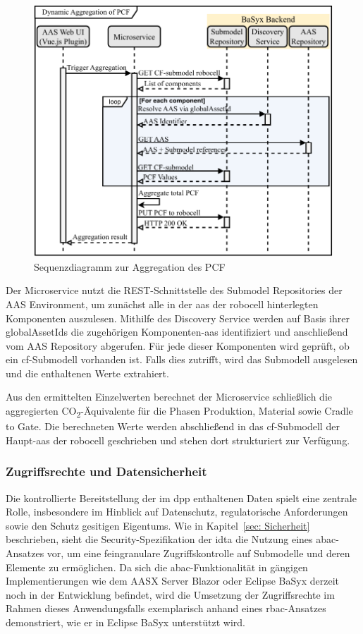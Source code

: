 \newpage
\begin{figure}[htbp]
    \centering
        \includegraphics[width=1\textwidth]{Bilder/DPP/Sequenzdiagramm_Neu.pdf}
    
    \caption{Sequenzdiagramm zur Aggregation des PCF}
    \label{fig:SequenzdiagrammPCF}
\end{figure}

Der Microservice nutzt die REST-Schnittstelle des Submodel Repositories der AAS Environment, um zunächst alle in der \acs{aas} der robocell hinterlegten Komponenten auszulesen. 
Mithilfe des Discovery Service werden auf Basis ihrer globalAssetIds die zugehörigen Komponenten-\acs{aas} identifiziert und anschließend vom AAS Repository abgerufen.
Für jede dieser Komponenten wird geprüft, ob ein \acs{cf}-Submodell vorhanden ist. 
Falls dies zutrifft, wird das Submodell ausgelesen und die enthaltenen Werte extrahiert.

Aus den ermittelten Einzelwerten berechnet der Microservice schließlich die aggregierten CO\textsubscript{2}-Äquivalente für die Phasen Produktion, Material sowie Cradle to Gate. 
Die berechneten Werte werden abschließend in das \acs{cf}-Submodell der Haupt-\acs{aas} der robocell geschrieben und stehen dort strukturiert zur Verfügung.

\subsubsection{Zugriffsrechte und Datensicherheit}
Die kontrollierte Bereitstellung der im \acs{dpp} enthaltenen Daten spielt eine zentrale Rolle, insbesondere im Hinblick auf Datenschutz, regulatorische Anforderungen sowie den Schutz gesitigen Eigentums. 
Wie in Kapitel~\ref{sec: Sicherheit} beschrieben, sieht die Security-Spezifikation der \acs{idta} die Nutzung eines \acs{abac}-Ansatzes vor, um eine feingranulare Zugriffskontrolle auf Submodelle und deren Elemente zu ermöglichen.
Da sich die \acs{abac}-Funktionalität in gängigen Implementierungen wie dem AASX Server Blazor oder Eclipse BaSyx derzeit noch in der Entwicklung befindet, wird die Umsetzung der Zugriffsrechte im Rahmen dieses Anwendungsfalls exemplarisch anhand eines \acs{rbac}-Ansatzes demonstriert, wie er in Eclipse BaSyx unterstützt wird.


